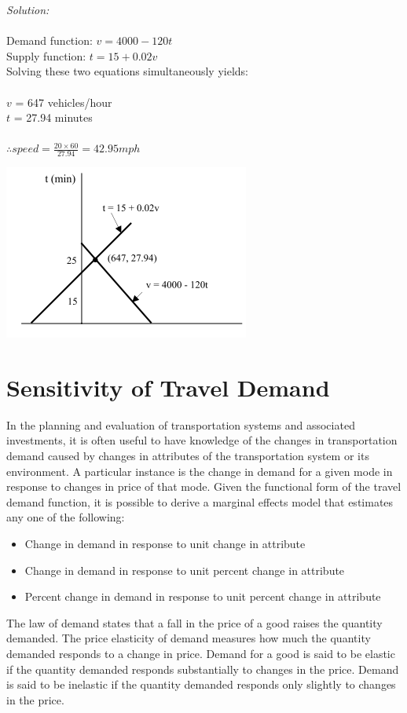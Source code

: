 \textit{Solution:}\\\\
Demand function: $v = 4000 - 120t$\\
Supply function: $ t = 15 + 0.02 v $\\
Solving these two equations simultaneously yields:\\\\
$v$ = 647 vehicles/hour\\
$t$ = 27.94 minutes\\\\
$ \therefore speed = \frac{20 \times 60}{27.94} = 42.95 mph$
\begin{center}
	\includegraphics{gfx/fig45.png}
\end{center}
%
\section{Sensitivity of Travel Demand}
In the planning and evaluation of transportation systems and associated investments, it is often useful to have knowledge of the changes in transportation demand caused by changes in attributes of the transportation system or its environment. A particular instance is the change in demand for a given mode in response to changes in price of that mode. Given the functional form of the travel demand function, it is possible to derive a marginal effects model that estimates any one of the following:
\begin{itemize}
	\item Change in demand in response to unit change in attribute
	\item Change in demand in response to unit percent change in attribute
	\item Percent change in demand in response to unit percent change in attribute
\end{itemize}
The law of demand states that a fall in the price of a good raises the quantity demanded. The price elasticity of demand measures how much the quantity demanded responds to a change in price. Demand for a good is said to be elastic if the quantity demanded responds substantially to changes in the price. Demand is said to be inelastic if the quantity demanded responds only slightly to changes in the price.
